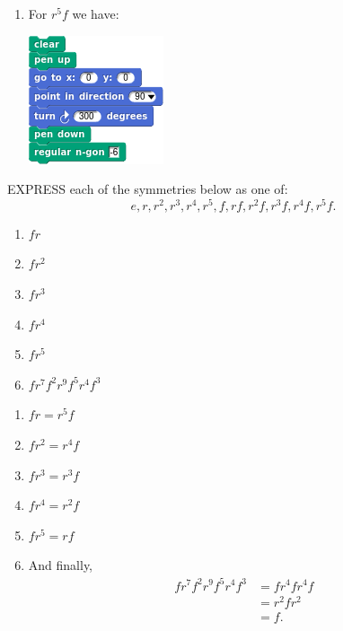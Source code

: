 \documentclass[noauthor,nooutcomes,12pt,hints,handout]{ximera}
\begin{document}
\begin{question}
\begin{freeResponse}
\begin{enumerate}
\begin{center}
      \end{center}
      \item For $r^5f$ we have:
      \begin{center}
        \includegraphics[width=.3\textwidth]{r5fHexSCRIPT.png}   \qquad {}
      \end{center}
    \end{enumerate}
    \end{freeResponse}
\end{question}
\mynewpage


\begin{question}
 EXPRESS each of the symmetries below as one of:
 \[
 e,r,r^2,r^3,r^4,r^5,f,rf,r^2f,r^3f, r^4f,r^5f.
 \]

 \begin{enumerate}
 \item $fr$
 \item $fr^2$
 \item $fr^3$
 \item $fr^4$
 \item $fr^5$
 \item $fr^7f^2r^9f^5r^4f^3$
 \end{enumerate}
 \begin{freeResponse}
   \begin{enumerate}
   \item $fr = r^5f$
   \item $fr^2 = r^4f$
   \item $fr^3 = r^3f$
   \item $fr^4 = r^2f$
   \item $fr^5 = rf$
   \item And finally,
     \begin{align*}
       fr^7f^2r^9f^5r^4f^3 &= fr^4fr^4f \\
       &= r^2f r^2\\
       &= f.
     \end{align*}
   \end{enumerate}
 \end{freeResponse}
\end{question}
\end{document}

